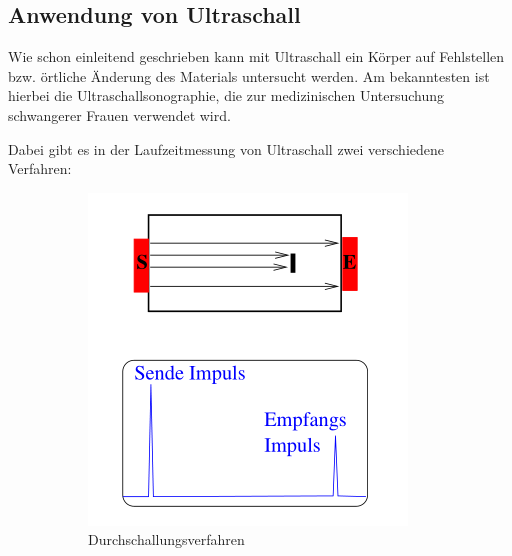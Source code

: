 \subsection{Anwendung von Ultraschall}
\label{ssec:theorie_anwendung}

Wie schon einleitend geschrieben kann mit Ultraschall ein Körper auf Fehlstellen bzw. örtliche Änderung des Materials untersucht werden.
Am bekanntesten ist hierbei die Ultraschallsonographie, die zur medizinischen Untersuchung schwangerer Frauen verwendet wird.

Dabei gibt es in der Laufzeitmessung von Ultraschall zwei verschiedene Verfahren:

\begin{figure}
    \centering
    \begin{subfigure}{0.3\textwidth}
        \centering
        \includegraphics[width=\textwidth]{images/bild01.png}
        \caption{Durchschallungsverfahren}
        \label{fig:durchschallung}
    \end{subfigure}
    \begin{subfigure}{0.3\textwidth}
        \centering

\end{subfigure}
\end{figure}
